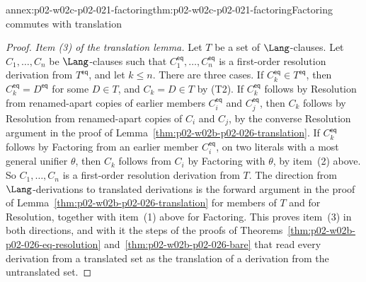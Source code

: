 \begin{annexitem}{annex:p02-w02c-p02-021-factoring}{thm:p02-w02c-p02-021-factoring}{Factoring commutes with translation}
\begin{proof}
\emph{Item (3) of the translation lemma.}  Let \(T\) be a set of
\(\Lang\)-clauses.  Let \(C_1,\ldots,C_n\) be \(\Lang\)-clauses such that
\(C_1^{\mathsf{eq}},\ldots,C_n^{\mathsf{eq}}\) is a first-order resolution
derivation from \(T^{\mathsf{eq}}\), and let \(k\leq n\).  There are three
cases.  If \(C_k^{\mathsf{eq}}\in T^{\mathsf{eq}}\), then
\(C_k^{\mathsf{eq}}=D^{\mathsf{eq}}\) for some \(D\in T\), and \(C_k=D\in T\)
by (T2).  If \(C_k^{\mathsf{eq}}\) follows by Resolution from renamed-apart
copies of earlier members \(C_i^{\mathsf{eq}}\) and \(C_j^{\mathsf{eq}}\),
then \(C_k\) follows by Resolution from renamed-apart copies of \(C_i\) and
\(C_j\), by the converse Resolution argument in the proof of
Lemma~\ref{thm:p02-w02b-p02-026-translation}.  If \(C_k^{\mathsf{eq}}\)
follows by Factoring from an earlier member \(C_i^{\mathsf{eq}}\), on two
literals with a most general unifier \(\theta\), then \(C_k\) follows from
\(C_i\) by Factoring with \(\theta\), by item~(2) above.  So
\(C_1,\ldots,C_n\) is a first-order resolution derivation from \(T\).  The
direction from \(\Lang\)-derivations to translated derivations is the
forward argument in the proof of
Lemma~\ref{thm:p02-w02b-p02-026-translation} for members of \(T\) and for
Resolution, together with item~(1) above for Factoring.  This proves
item~(3) in both directions, and with it the steps of the proofs of
Theorems~\ref{thm:p02-w02b-p02-026-eq-resolution}
and~\ref{thm:p02-w02b-p02-026-bare} that read every derivation from a
translated set as the translation of a derivation from the untranslated set.
\end{proof}
\end{annexitem}

